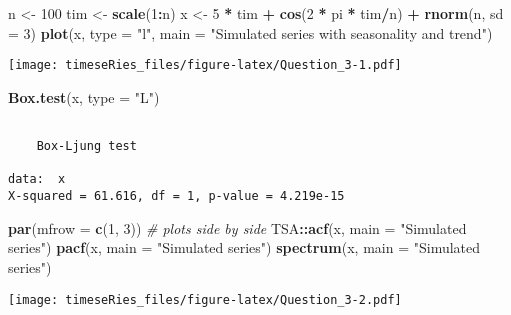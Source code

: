 \documentclass[]{book}
\newenvironment{Shaded}{\begin{snugshade}}{\end{snugshade}}
\newcommand{\KeywordTok}[1]{\textcolor[rgb]{0.13,0.29,0.53}{\textbf{#1}}}
\newcommand{\DataTypeTok}[1]{\textcolor[rgb]{0.13,0.29,0.53}{#1}}
\newcommand{\DecValTok}[1]{\textcolor[rgb]{0.00,0.00,0.81}{#1}}
\newcommand{\StringTok}[1]{\textcolor[rgb]{0.31,0.60,0.02}{#1}}
\newcommand{\CommentTok}[1]{\textcolor[rgb]{0.56,0.35,0.01}{\textit{#1}}}
\newcommand{\OperatorTok}[1]{\textcolor[rgb]{0.81,0.36,0.00}{\textbf{#1}}}
\newcommand{\NormalTok}[1]{#1}
\begin{document}
\begin{Shaded}
\begin{Highlighting}[]
\NormalTok{n <-}\StringTok{ }\DecValTok{100}
\NormalTok{tim <-}\StringTok{ }\KeywordTok{scale}\NormalTok{(}\DecValTok{1}\OperatorTok{:}\NormalTok{n)}
\NormalTok{x <-}\StringTok{ }\DecValTok{5} \OperatorTok{*}\StringTok{ }\NormalTok{tim }\OperatorTok{+}\StringTok{ }\KeywordTok{cos}\NormalTok{(}\DecValTok{2} \OperatorTok{*}\StringTok{ }\NormalTok{pi }\OperatorTok{*}\StringTok{ }\NormalTok{tim}\OperatorTok{/}\NormalTok{n) }\OperatorTok{+}\StringTok{ }\KeywordTok{rnorm}\NormalTok{(n, }\DataTypeTok{sd =} \DecValTok{3}\NormalTok{)}
\KeywordTok{plot}\NormalTok{(x, }\DataTypeTok{type =} \StringTok{"l"}\NormalTok{, }\DataTypeTok{main =} \StringTok{"Simulated series with seasonality and trend"}\NormalTok{)}
\end{Highlighting}
\end{Shaded}

\texttt{[image: timeseRies\_files/figure-latex/Question\_3-1.pdf]}

\begin{Shaded}
\begin{Highlighting}[]
\KeywordTok{Box.test}\NormalTok{(x, }\DataTypeTok{type =} \StringTok{"L"}\NormalTok{)}
\end{Highlighting}
\end{Shaded}

\begin{verbatim}

    Box-Ljung test

data:  x
X-squared = 61.616, df = 1, p-value = 4.219e-15
\end{verbatim}

\begin{Shaded}
\begin{Highlighting}[]
\KeywordTok{par}\NormalTok{(}\DataTypeTok{mfrow =} \KeywordTok{c}\NormalTok{(}\DecValTok{1}\NormalTok{, }\DecValTok{3}\NormalTok{))  }\CommentTok{# plots side by side}
\NormalTok{TSA}\OperatorTok{::}\KeywordTok{acf}\NormalTok{(x, }\DataTypeTok{main =} \StringTok{"Simulated series"}\NormalTok{)}
\KeywordTok{pacf}\NormalTok{(x, }\DataTypeTok{main =} \StringTok{"Simulated series"}\NormalTok{)}
\KeywordTok{spectrum}\NormalTok{(x, }\DataTypeTok{main =} \StringTok{"Simulated series"}\NormalTok{)}
\end{Highlighting}
\end{Shaded}

\texttt{[image: timeseRies\_files/figure-latex/Question\_3-2.pdf]}
\end{document}
